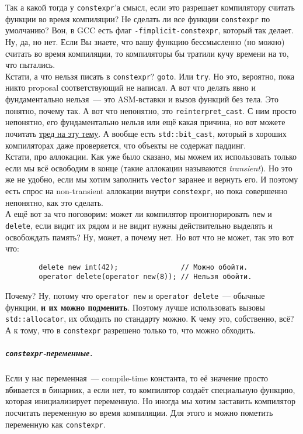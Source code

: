 \documentclass{article}
\begin{document}
    Так а какой тогда у \texttt{constexpr}'а смысл, если это разрешает компилятору считать функции во время компиляции? Не сделать ли все функции \texttt{constexpr} по умолчанию? Вон, в GCC есть флаг \texttt{-fimplicit-constexpr}, который так делает. Ну, да, но нет. Если Вы знаете, что вашу функцию бессмысленно (но можно) считать во время компиляции, то компиляторы бы тратили кучу времени на то, что пытались.\\
    Кстати, а что нельзя писать в \texttt{constexpr}? \texttt{goto}. Или \texttt{try}. Но это, вероятно, пока никто proposal соответствующий не написал. А вот что делать явно и фундаментально нельзя~--- это ASM-вставки и вызов функций без тела. Это понятно, почему так. А вот что непонятно, это \texttt{reinterpret_cast}. С ним просто непонятно, его фундаментально нельзя или ещё какая причина, но вот можете почитать \href{https://lists.isocpp.org/std-discussion/2021/10/1442.php}{тред на эту тему}. А вообще есть \texttt{std::bit_cast}, который в хороших компиляторах даже проверяется, что объекты не содержат паддинг.\\
    Кстати, про аллокации. Как уже было сказано, мы можем их использовать только если мы всё освободим в конце (такие аллокации называются \textit{transient}). Но это же не удобно, если мы хотим заполнить \texttt{vector} заранее и вернуть его. И поэтому есть спрос на non-transient аллокации внутри \texttt{constexpr}, но пока совершенно непонятно, как это сделать.\\
    А ещё вот за что поговорим: может ли компилятор проигнорировать \texttt{new} и \texttt{delete}, если видит их рядом и не видит нужны действительно выделять и освобождать память? Ну, может, а почему нет. Но вот что не может, так это вот что:
    \begin{verbatim}
        delete new int(42);               // Можно обойти.
        operator delete(operator new(8)); // Нельзя обойти.
    \end{verbatim}
    Почему? Ну, потому что \texttt{operator new} и \texttt{operator delete}~--- обычные функции, \textbf{и их можно подменить}. Поэтому лучше использовать вызовы \texttt{std::allocator}, их обходить по стандарту можно. К чему это, собственно, всё? А к тому, что в \texttt{constexpr} разрешено только то, что можно обходить.
    \subparagraph{\texttt{constexpr}-переменные.}
    Если у нас переменная~--- compile-time константа, то её значение просто вбивается в бинарник, а если нет, то компилятор создаёт специальную функцию, которая инициализирует переменную. Но иногда мы хотим заставить компилятор посчитать переменную во время компиляции. Для этого и можно пометить переменную как \texttt{constexpr}.\\
\end{document}
